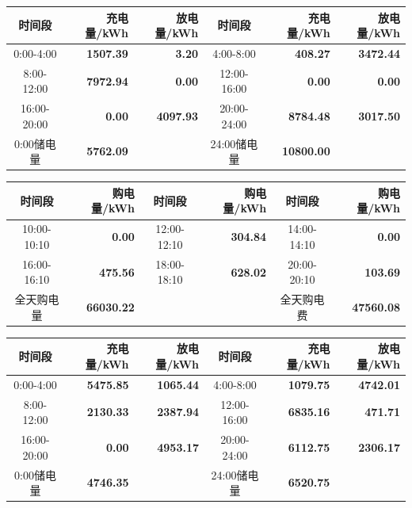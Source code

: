 {\begin{center}
\vspace{0.15\baselineskip}
\begin{tabular}{|c|r|r|c|r|r|}
\hline
时间段 & 充电量/kWh & 放电量/kWh & 时间段 & 充电量/kWh & 放电量/kWh \\
\hline0:00-4:00 & \textbf{1507.39} & \textbf{3.20} & 4:00-8:00 & \textbf{408.27} & \textbf{3472.44} \\
\hline8:00-12:00 & \textbf{7972.94} & \textbf{0.00} & 12:00-16:00 & \textbf{0.00} & \textbf{0.00} \\
\hline16:00-20:00 & \textbf{0.00} & \textbf{4097.93} & 20:00-24:00 & \textbf{8784.48} & \textbf{3017.50} \\
\hline0:00储电量 & \textbf{5762.09} & & 24:00储电量 & \textbf{10800.00} & \\
\hline
\end{tabular}
\par{}

\vspace{0.15\baselineskip}
\begin{tabular}{|c|r|c|r|c|r|}
\hline
时间段 & 购电量/kWh & 时间段 & 购电量/kWh & 时间段 & 购电量/kWh \\
\hline10:00-10:10 & \textbf{0.00} & 12:00-12:10 & \textbf{304.84} & 14:00-14:10 & \textbf{0.00} \\
\hline16:00-16:10 & \textbf{475.56} & 18:00-18:10 & \textbf{628.02} & 20:00-20:10 & \textbf{103.69} \\
\hline
全天购电量 & \textbf{66030.22} & & & 全天购电费 & \textbf{47560.08} \\
\hline
\end{tabular}
\par{}

\vspace{0.15\baselineskip}
\begin{tabular}{|c|r|r|c|r|r|}
\hline
时间段 & 充电量/kWh & 放电量/kWh & 时间段 & 充电量/kWh & 放电量/kWh \\
\hline0:00-4:00 & \textbf{5475.85} & \textbf{1065.44} & 4:00-8:00 & \textbf{1079.75} & \textbf{4742.01} \\
\hline8:00-12:00 & \textbf{2130.33} & \textbf{2387.94} & 12:00-16:00 & \textbf{6835.16} & \textbf{471.71} \\
\hline16:00-20:00 & \textbf{0.00} & \textbf{4953.17} & 20:00-24:00 & \textbf{6112.75} & \textbf{2306.17} \\
\hline0:00储电量 & \textbf{4746.35} & & 24:00储电量 & \textbf{6520.75} & \\
\hline
\end{tabular}
\par{}


\end{center}}
